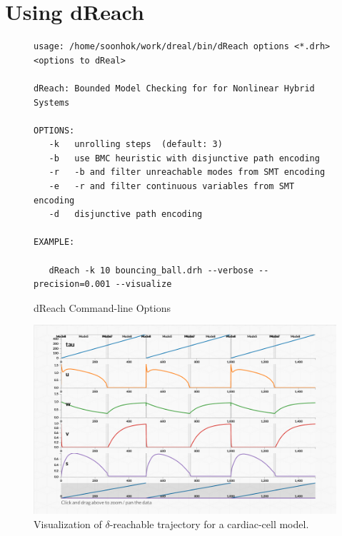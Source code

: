 \section{Using dReach}

\begin{figure}[!h]
  \centering
  \begin{Verbatim}[fontfamily=courier, frame=single, framesep=1mm, fontsize=\scriptsize]
usage: /home/soonhok/work/dreal/bin/dReach options <*.drh> <options to dReal>

dReach: Bounded Model Checking for for Nonlinear Hybrid Systems

OPTIONS:
   -k   unrolling steps  (default: 3)
   -b   use BMC heuristic with disjunctive path encoding
   -r   -b and filter unreachable modes from SMT encoding
   -e   -r and filter continuous variables from SMT encoding
   -d   disjunctive path encoding

EXAMPLE:

   dReach -k 10 bouncing_ball.drh --verbose --precision=0.001 --visualize

\end{Verbatim}
  \caption{dReach Command-line Options}
  \label{fig:dreach-cmd-line-options}
\end{figure}


\begin{figure}
  \centering
  \includegraphics[width=\textwidth]{images/cardiac}
  \caption{Visualization of $\delta$-reachable trajectory for
    a cardiac-cell model.}
  \label{fig:viz}
\end{figure}


